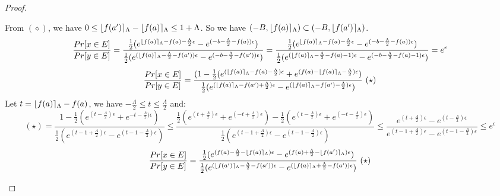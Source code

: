 \documentclass[a4paper,11pt]{article}
\begin{document}
\begin{proof}
\begin{itemize}
	From $(\diamond)$, we have $0 \leq \lfloor f(a') \rceil_{\Lambda} - \lfloor f(a) \rceil_{\Lambda} \leq 1 + \Lambda$.
	So we have $(-B, \lfloor f(a) \rceil_{\Lambda}) \subset (-B, \lfloor f(a') \rceil_{\Lambda})$.
	\[
	\frac{Pr[x \in E]}{Pr[y \in E]} 
	= \frac{\frac{1}{2}(
				e^{\lfloor f(a) \rceil_{\Lambda} - f(a) -\frac{\Lambda}{2}\epsilon}
				- e^{(-b -\frac{\Lambda}{2} - f(a))\epsilon})}
				{\frac{1}{2}(
				e^{(\lfloor f(a) \rceil_{\Lambda} -\frac{\Lambda}{2} - f(a'))\epsilon}
				- e^{(-b -\frac{\Lambda}{2} - f(a'))\epsilon})} \\
	= \frac{\frac{1}{2}(
				e^{\lfloor f(a) \rceil_{\Lambda} - f(a) -\frac{\Lambda}{2}\epsilon}
				- e^{(-b -\frac{\Lambda}{2} - f(a))\epsilon})}
				{\frac{1}{2}(
				e^{(\lfloor f(a) \rceil_{\Lambda} -\frac{\Lambda}{2} - f(a) - 1)\epsilon}
				- e^{(-b -\frac{\Lambda}{2} - f(a) - 1)\epsilon})} \\
	= e^{\epsilon}
	\]
%
	\[
	\frac{Pr[x \in E]}{Pr[y \in E]} 
	= \frac{(1 - {\frac{1}{2}(
				e^{(\round{f(a)}_{\Lambda} - f(a) - \frac{\Lambda}{2})\epsilon}
				+ e^{(f(a) - \round{f(a)}_{\Lambda} -\frac{\Lambda}{2})\epsilon})}
			}
			{\frac{1}{2}(
				e^{(\round{f(a)}_{\Lambda} - f(a') + \frac{\Lambda}{2})\epsilon}
				- e^{(\round{f(a)}_{\Lambda} - f(a') - \frac{\Lambda}{2})\epsilon})}~(\star)
	\]
	Let $t = \lfloor f(a) \rceil_{\Lambda} - f(a)$, we have $-\frac{\Lambda}{2} \leq t \leq \frac{\Lambda}{2} $ and:
	\[
	(\star) = \frac{1 - {\frac{1}{2}(
				e^{(t - \frac{\Lambda}{2})\epsilon}
				+ e^{-t -\frac{\Lambda}{2})\epsilon})}
			}
			{\frac{1}{2}(
				e^{(t - 1 + \frac{\Lambda}{2})\epsilon}
				- e^{(t - 1 - \frac{\Lambda}{2})\epsilon})}
	\leq \frac{\frac{1}{2}(
				e^{(t + \frac{\Lambda}{2})\epsilon}
				+ e^{(-t +\frac{\Lambda}{2})\epsilon}) 
				- \frac{1}{2}(
				e^{(t - \frac{\Lambda}{2})\epsilon}
				+ e^{(-t -\frac{\Lambda}{2})\epsilon})
			}
			{\frac{1}{2}(
				e^{(t - 1 + \frac{\Lambda}{2})\epsilon}
				- e^{(t - 1 - \frac{\Lambda}{2})\epsilon})}
	\leq \frac{
				e^{(t + \frac{\Lambda}{2})\epsilon} 
				-
				e^{(t - \frac{\Lambda}{2})\epsilon}
			}
			{
				e^{(t - 1 + \frac{\Lambda}{2})\epsilon}
				- e^{(t - 1 - \frac{\Lambda}{2})\epsilon}
			}	
	\leq e^{\epsilon}
	\]
	\[
	\frac{Pr[x \in E]}{Pr[y \in E]} 
	= \frac{
			\frac{1}{2}(
				e^{(f(a) - \frac{\Lambda}{2} - \round{f(a)}_{\Lambda})\epsilon}
				- e^{(f(a) + \frac{\Lambda}{2} - \round{f(a')}_{\Lambda})\epsilon})
			}
			{
			\frac{1}{2}(
				e^{(\round{f(a')}_{\Lambda} - \frac{\Lambda}{2} - f(a'))\epsilon}
				- e^{(\round{f(a)}_{\Lambda} + \frac{\Lambda}{2}  - f(a'))\epsilon})
			} ~ (\star)
	\]
	\begin{itemize}


\end{itemize}
\end{itemize}
\end{proof}
\end{document}
